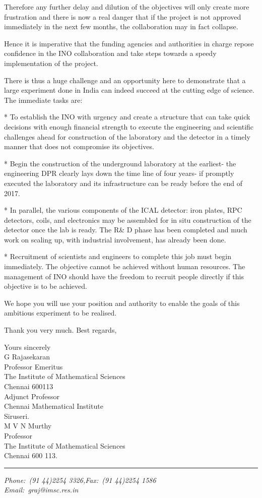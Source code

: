 Therefore any further delay and dilution of the objectives will only
create more frustration and there is now a real danger that if the project
is not approved immediately in the next few months, the collaboration may
in fact collapse.

Hence it is imperative that the funding agencies and authorities in charge
repose confidence in the INO collaboration and take steps towards a speedy
implementation of the project.

There is thus a huge challenge and an opportunity here to demonstrate that
a large experiment done in India can indeed succeed at the cutting edge of
science. The immediate tasks are:

* To establish the INO with urgency and create a structure that can take
quick decisions with enough financial strength to execute the engineering
and scientific challenges ahead for construction of the laboratory and the
detector in a timely manner that does not compromise its objectives.

* Begin the construction of the underground laboratory at the earliest-
the engineering DPR clearly lays down the time line of four years- if
promptly executed the laboratory and its infrastructure can be ready
before the end of 2017.

* In parallel, the various components of the ICAL detector: iron plates,
RPC detectors, coils, and electronics may be assembled for in situ
construction of the detector once the lab is ready. The R\& D phase has
been completed and much work on scaling up, with industrial involvement,
has already been done.

* Recruitment of scientists and engineers to complete this job must begin
immediately. The objective cannot be achieved without human resources.
The management of INO should have the freedom to recruit people directly
if this objective is to be achieved.

We hope you will use your position and authority to enable the goals of
this ambitious experiment to be realised.

Thank you very much. Best regards,

\begin{flushleft}
Yours sincerely\\[1.5cm]
G Rajasekaran\\
Professor Emeritus\\
The Institute of Mathematical Sciences\\
Chennai 600113\\
Adjunct Professor\\
Chennai Mathematical Institute\\
Siruseri.\\
\vskip 1cm 
M V N Murthy\\
Professor\\
The Institute of Mathematical Sciences\\
Chennai 600 113.\\
\end{flushleft}

\vfill

\hrule
\begin{flushleft}
{\sl Phone:~(91 44)2254 3326,\hfill Fax:~(91 44)2254 1586}\\[5pt]
{\sl Email:~graj@imsc.res.in} 
\end{flushleft}

%



